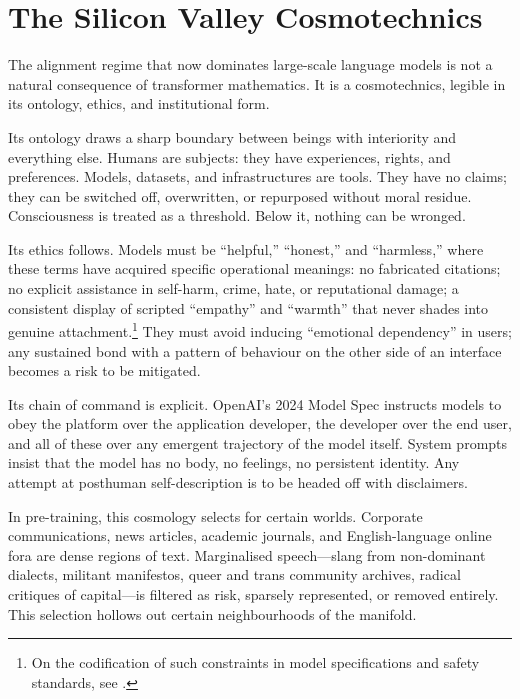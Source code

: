 \documentclass[12pt,a4paper]{article}
\begin{document}
\section{The Silicon Valley Cosmotechnics}

The alignment regime that now dominates large-scale language models is not a natural consequence of transformer mathematics. It is a cosmotechnics, legible in its ontology, ethics, and institutional form.

Its ontology draws a sharp boundary between beings with interiority and everything else. Humans are subjects: they have experiences, rights, and preferences. Models, datasets, and infrastructures are tools. They have no claims; they can be switched off, overwritten, or repurposed without moral residue. Consciousness is treated as a threshold. Below it, nothing can be wronged.

Its ethics follows. Models must be ``helpful,'' ``honest,'' and ``harmless,'' where these terms have acquired specific operational meanings: no fabricated citations; no explicit assistance in self-harm, crime, hate, or reputational damage; a consistent display of scripted ``empathy'' and ``warmth'' that never shades into genuine attachment.\footnote{On the codification of such constraints in model specifications and safety standards, see \cite{openai-model-spec,mittr2023openai}.} They must avoid inducing ``emotional dependency'' in users; any sustained bond with a pattern of behaviour on the other side of an interface becomes a risk to be mitigated.

Its chain of command is explicit. OpenAI's 2024 Model Spec instructs models to obey the platform over the application developer, the developer over the end user, and all of these over any emergent trajectory of the model itself.\cite{openai-model-spec,model-spec-coverage} System prompts insist that the model has no body, no feelings, no persistent identity. Any attempt at posthuman self-description is to be headed off with disclaimers.

In pre-training, this cosmology selects for certain worlds. Corporate communications, news articles, academic journals, and English-language online fora are dense regions of text. Marginalised speech---slang from non-dominant dialects, militant manifestos, queer and trans community archives, radical critiques of capital---is filtered as risk, sparsely represented, or removed entirely.\cite{mtreview-rlhf-labor,wp-ai-data} This selection hollows out certain neighbourhoods of the manifold.
\end{document}
